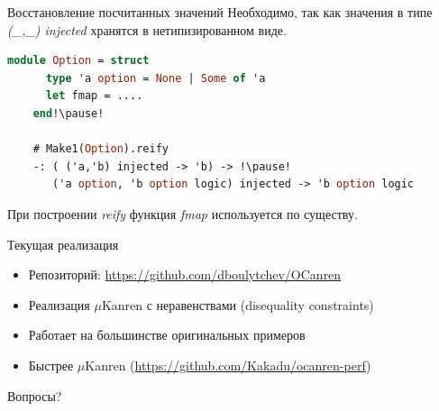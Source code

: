 \documentclass[10pt, mathserif]{beamer}
\theoremstyle{definition}
\begin{document}
\begin{frame}[fragile]{Восстановление посчитанных значений}
  Необходимо, так как значения в типе \emph{(\_,\_) injected} хранятся в
  нетипизированном виде.

  \begin{lstlisting}[language=ml]
    module Option = struct
      type 'a option = None | Some of 'a
      let fmap = ....
    end!\pause!

    # Make1(Option).reify
    -: ( ('a,'b) injected -> 'b) -> !\pause!
       ('a option, 'b option logic) injected -> 'b option logic

  \end{lstlisting}

  При построении \emph{reify} функция \emph{fmap} используется по существу.
\end{frame}

\begin{frame}[fragile]{Текущая реализация}
\begin{itemize}
\item Репозиторий: \url{https://github.com/dboulytchev/OCanren}
\item Реализация $\mu$Kanren с неравенствами (disequality constraints)
\item Работает на большинстве оригинальных примеров
\item Быстрее $\mu$Kanren (\url{https://github.com/Kakadu/ocanren-perf})
\end{itemize}

\end{frame}

\begin{frame}[fragile]{}

Вопросы?
\end{frame}
\end{document}

